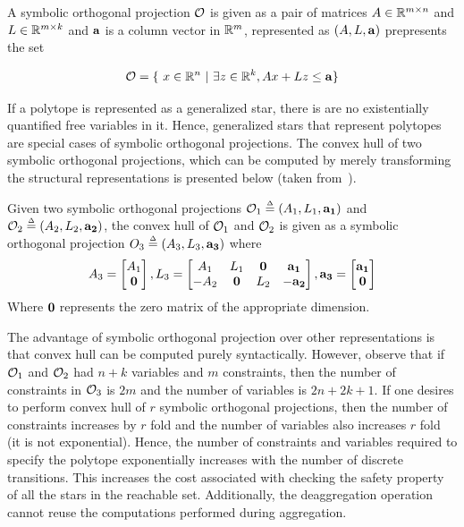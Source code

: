 \vspace{-0.1cm}
\begin{definition}
A symbolic orthogonal projection ${\cal O}$ is given as a pair of matrices $A \in \reals^{m \times n}$ and $L \in \reals^{m \times k}$ and ${\bf a}$ is a column vector in $\reals^m$, represented as $(A, L, {\bf a})$ prepresents the set

$$
\O = \{~x \in \reals^n~|~ \exists z \in \reals^k, Ax + Lz \leq {\bf a}\}
$$ 
\end{definition}
\vspace{-0.1cm}

If a polytope is represented as a generalized star, there is are no existentially quantified free variables in it. Hence, generalized stars that represent polytopes are special cases of symbolic orthogonal projections. The convex hull of two symbolic orthogonal projections, which can be computed by merely transforming the structural representations is presented below (taken from~\cite{hagemann2014reachability}).

\vspace{-0.1cm}
\begin{definition}
Given two symbolic orthogonal projections ${\cal O}_1 \mathrel{\stackrel{\scriptscriptstyle\Delta}{=}} (A_1, L_1, {\bf a_1})$ and ${\cal O}_2 \mathrel{\stackrel{\scriptscriptstyle\Delta}{=}} (A_2, L_2, {\bf a_2})$, the convex hull of ${\cal O}_1$ and ${\cal O}_2$ is given as a symbolic orthogonal projection $O_3 \mathrel{\stackrel{\scriptscriptstyle\Delta}{=}} (A_3, L_3, {\bf a_3})$ where 
$$
A_3 = 
\begin{bmatrix} 
A_1 \\ 
{\bf 0} 
\end{bmatrix}, 
L_3 = 
\begin{bmatrix} 
A_1 & L_1 & {\bf 0} & {\bf a_1} \\
-A_2 & {\bf 0} & L_2 & -{\bf a_2}
\end{bmatrix},
{\bf a_3} =
\begin{bmatrix}
{\bf a_1} \\
{\bf 0}
\end{bmatrix}
$$
Where ${\bf 0}$ represents the zero matrix of the appropriate dimension. 
\end{definition}
\vspace{-0.1cm}

The advantage of symbolic orthogonal projection over other representations is that convex hull can be computed purely syntactically. 
%
However, observe that if ${\cal O}_1$ and ${\cal O}_2$ had $n+k$ variables and $m$ constraints, then the number of constraints in ${\cal O}_3$ is $2m$ and the number of variables is $2n+2k+1$. 
%
If one desires to perform convex hull of $r$ symbolic orthogonal projections, then the number of constraints increases by $r$ fold and the number of variables also increases  $r$ fold (it is not exponential). 
%
Hence, the number of constraints and variables required to specify the polytope exponentially increases with the number of discrete transitions. This increases the cost associated with checking the safety property of all the stars in the reachable set. Additionally, the deaggregation operation cannot reuse the computations performed during aggregation.

